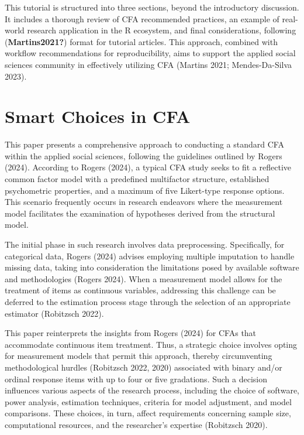\documentclass[
  a4paper,
]{article}
\begin{document}
This tutorial is structured into three sections, beyond the introductory
discussion. It includes a thorough review of CFA recommended practices,
an example of real-world research application in the R ecosystem, and
final considerations, following (\textbf{Martins2021?}) format for
tutorial articles. This approach, combined with workflow recommendations
for reproducibility, aims to support the applied social sciences
community in effectively utilizing CFA (Martins 2021; Mendes-Da-Silva
2023).


\section{Smart Choices in CFA}\label{smart-choices-in-cfa}

This paper presents a comprehensive approach to conducting a standard
CFA within the applied social sciences, following the guidelines
outlined by Rogers (2024). According to Rogers (2024), a typical CFA
study seeks to fit a reflective common factor model with a predefined
multifactor structure, established psychometric properties, and a
maximum of five Likert-type response options. This scenario frequently
occurs in research endeavors where the measurement model facilitates the
examination of hypotheses derived from the structural model.

The initial phase in such research involves data preprocessing.
Specifically, for categorical data, Rogers (2024) advises employing
multiple imputation to handle missing data, taking into consideration
the limitations posed by available software and methodologies (Rogers
2024). When a measurement model allows for the treatment of items as
continuous variables, addressing this challenge can be deferred to the
estimation process stage through the selection of an appropriate
estimator (Robitzsch 2022).

This paper reinterprets the insights from Rogers (2024) for CFAs that
accommodate continuous item treatment. Thus, a strategic choice involves
opting for measurement models that permit this approach, thereby
circumventing methodological hurdles (Robitzsch 2022, 2020) associated
with binary and/or ordinal response items with up to four or five
gradations. Such a decision influences various aspects of the research
process, including the choice of software, power analysis, estimation
techniques, criteria for model adjustment, and model comparisons. These
choices, in turn, affect requirements concerning sample size,
computational resources, and the researcher's expertise (Robitzsch
2020).
\end{document}
